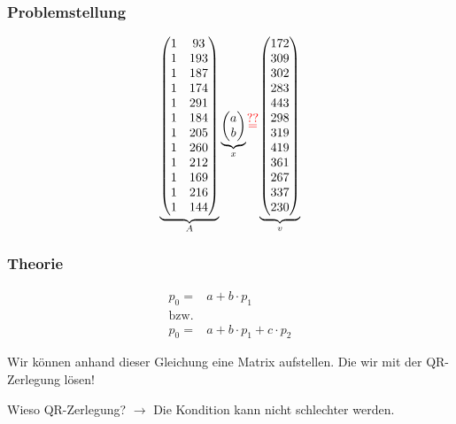 \documentclass{beamer}
\newcommand\myeq{\stackrel{\mathclap{\normalfont\mbox{??}}}{=}}
\begin{document}
\begin{frame}
    \frametitle{Problemstellung}
    \small
    \begin{align*}
        \underbrace{
        \begin{pmatrix}
            1 &  93 \\
            1 & 193 \\
            1 & 187 \\
            1 & 174 \\
            1 & 291 \\
            1 & 184 \\
            1 & 205 \\
            1 & 260 \\
            1 & 212 \\
            1 & 169 \\
            1 & 216 \\
            1 & 144
        \end{pmatrix}
        }_A
        \underbrace{
        \begin{pmatrix}
            a \\ b
        \end{pmatrix}
        }_x
        {\color{red}\myeq}
        \underbrace{
        \begin{pmatrix}        
            172 \\
            309 \\
            302 \\
            283 \\
            443 \\
            298 \\
            319 \\
            419 \\
            361 \\
            267 \\
            337 \\
            230
        \end{pmatrix}
        }_v
    \end{align*}
\end{frame}

\begin{frame}
\frametitle{Theorie}
\begin{align*}
p_0 =& a + b \cdot p_1 \\
\text{bzw.} \\
p_0 =& a + b \cdot p_1 + c \cdot p_2
\end{align*}

Wir können anhand dieser Gleichung eine Matrix aufstellen. Die wir mit der QR-Zerlegung lösen!

Wieso QR-Zerlegung? $\rightarrow$ Die Kondition kann nicht schlechter werden.

\end{frame}
\end{document}
